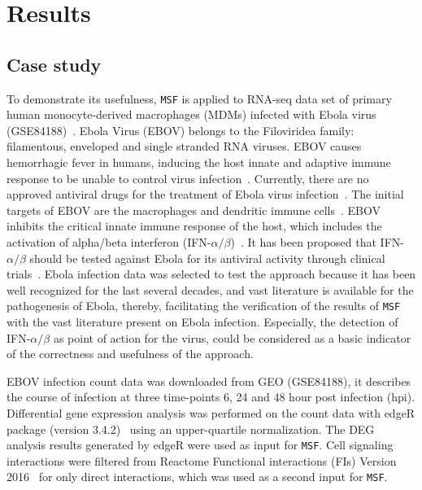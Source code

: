 \documentclass[10pt,a4paper,twocolumn]{article}
\begin{document}
	
	\section*{Results}
	
	\subsection*{Case study}
	
	To demonstrate its usefulness, \texttt{MSF} is applied to
        RNA-seq data set of primary human monocyte-derived macrophages
        (MDMs) infected with Ebola virus
        (GSE84188)~\cite{Olejnik}. Ebola Virus (EBOV) belongs to the
        Filoviridea family: filamentous, enveloped and single stranded
        RNA viruses. EBOV causes hemorrhagic fever in humans, inducing
        the host innate and adaptive immune response to be unable to
        control virus infection~\cite{Prins}. Currently, there are no
        approved antiviral drugs for the treatment of Ebola virus
        infection~\cite{Konde,Rhein}.  The initial targets of EBOV are
        the macrophages and dendritic immune
        cells~\cite{Falasca,Rhein}. EBOV inhibits the critical innate
        immune response of the host, which includes the activation of
        alpha/beta interferon (IFN-$\alpha /
        \beta$)~\cite{Prins,Konde,Cardenas}. It has been proposed that
        IFN-$\alpha / \beta$ should be tested against Ebola for its
        antiviral activity through clinical trials~\cite{Konde}. Ebola
        infection data was selected to test the approach because it
        has been well recognized for the last several decades, and
        vast literature is available for the pathogenesis of Ebola,
        thereby, facilitating the verification of the results of
        \texttt{MSF} with the vast literature present on Ebola
        infection. Especially, the detection of IFN-$\alpha / \beta$
        as point of action for the virus, could be considered as a
        basic indicator of the correctness and usefulness of the
        approach.
	
	EBOV infection count data was downloaded from GEO (GSE84188),
        it describes the course of infection at three time-points 6,
        24 and 48 hour post infection (hpi). Differential gene
        expression analysis was performed on the count data with edgeR
        package (version 3.4.2)~\cite{edgeR} using an upper-quartile
        normalization. The DEG analysis results generated by edgeR
        were used as input for \texttt{MSF}. Cell signaling
        interactions were filtered from Reactome Functional
        interactions (FIs) Version 2016~\cite{Cytokegg} for only
        direct interactions, which was used as a second input for
        \texttt{MSF}.
	
\end{document}
